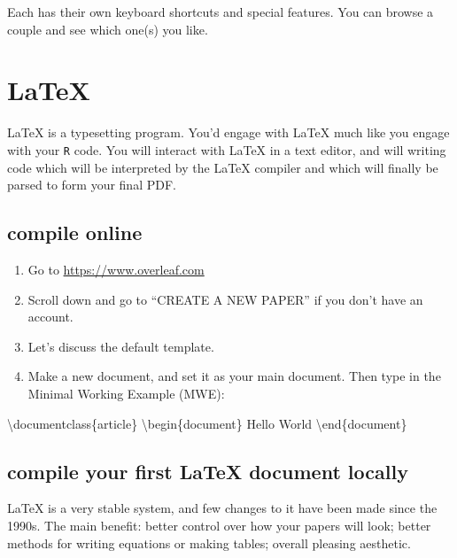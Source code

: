 \documentclass[
  letterpaper,
]{book}
\newenvironment{Shaded}{\begin{snugshade}}{\end{snugshade}}
\newcommand{\ExtensionTok}[1]{\textcolor[rgb]{0.00,0.23,0.31}{#1}}
\newcommand{\NormalTok}[1]{\textcolor[rgb]{0.00,0.23,0.31}{#1}}
\providecommand{\tightlist}{%
  \setlength{\itemsep}{0pt}\setlength{\parskip}{0pt}}\usepackage{longtable,booktabs,array}
\theoremstyle{definition}
\theoremstyle{definition}
\theoremstyle{plain}
\theoremstyle{definition}
\theoremstyle{plain}
\theoremstyle{plain}
\theoremstyle{remark}
\begin{document}
Each has their own keyboard shortcuts and special features. You can
browse a couple and see which one(s) you like.

\hypertarget{latex}{%
\section{LaTeX}\label{latex}}

LaTeX is a typesetting program. You'd engage with LaTeX much like you
engage with your \texttt{R} code. You will interact with LaTeX in a text
editor, and will writing code which will be interpreted by the LaTeX
compiler and which will finally be parsed to form your final PDF.

\hypertarget{compile-online}{%
\subsection{compile online}\label{compile-online}}

\begin{enumerate}
\def\labelenumi{\arabic{enumi}.}
\tightlist
\item
  Go to \url{https://www.overleaf.com}
\item
  Scroll down and go to ``CREATE A NEW PAPER'' if you don't have an
  account.
\item
  Let's discuss the default template.
\item
  Make a new document, and set it as your main document. Then type in
  the Minimal Working Example (MWE):
\end{enumerate}

\begin{Shaded}
\begin{Highlighting}[]
\ExtensionTok{\textbackslash{}documentclass\{article\}}
\ExtensionTok{\textbackslash{}begin\{document\}}
\ExtensionTok{Hello}\NormalTok{ World}
\ExtensionTok{\textbackslash{}end\{document\}}
\end{Highlighting}
\end{Shaded}

\hypertarget{compile-your-first-latex-document-locally}{%
\subsection{compile your first LaTeX document
locally}\label{compile-your-first-latex-document-locally}}

LaTeX is a very stable system, and few changes to it have been made
since the 1990s. The main benefit: better control over how your papers
will look; better methods for writing equations or making tables;
overall pleasing aesthetic.
\end{document}
